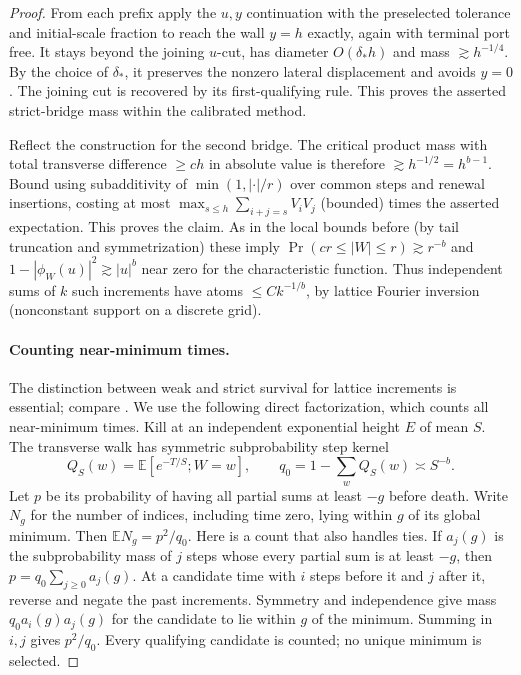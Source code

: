 \begin{proof}
From each prefix apply the $u,y$ continuation with the preselected
tolerance and initial-scale fraction to reach the wall $y=h$ exactly,
again with terminal port free. It stays beyond the joining $u$-cut,
has diameter $O(\delta_*h)$ and mass $\gtrsim h^{-1/4}$. By the choice
of $\delta_*$, it preserves the nonzero lateral displacement and avoids
$y=0$. The joining cut is recovered by its first-qualifying rule. This
proves the asserted strict-bridge mass within the calibrated method.

Reflect the construction for the second bridge. The critical product mass with total transverse difference $\ge ch$ in absolute value is therefore $\gtrsim h^{-1/2}=h^{b-1}$. Bound using subadditivity of \(\min(1,|\cdot|/r)\) over common steps and renewal insertions, costing at most \(\max_{s\le h}\sum_{i+j=s}V_i V_j\) (bounded) times the asserted expectation. This proves the claim. As in the local bounds before (by tail truncation and symmetrization) these imply \(\Pr(c r\le |W|\le r)\gtrsim r^{-b}\) and \(1-|\phi_W(u)|^2\gtrsim |u|^b\) near zero for the characteristic function. Thus independent sums of \(k\) such increments have atoms \(\le C k^{-1/b}\), by lattice Fourier inversion (nonconstant support on a discrete grid).

\paragraph{Counting near-minimum times.}
The distinction between weak and strict survival for lattice increments
is essential; compare \cite[Section 2.2]{Vysotsky2014}. We use the
following direct factorization, which counts all near-minimum times.
Kill at an independent exponential height $E$ of mean $S$. The transverse
walk has symmetric subprobability step kernel
\[
 Q_S(w)=\mathbb E[e^{-T/S};W=w],\qquad
 q_0=1-\sum_wQ_S(w)\asymp S^{-b}.
\]
Let $p$ be its probability of having all partial sums at least $-g$
before death. Write $N_g$ for the number of indices, including time zero,
lying within
$g$ of its global minimum. Then $\mathbb E N_g=p^2/q_0$. Here is a count that
also handles ties. If $a_j(g)$ is the subprobability mass of $j$ steps
whose every partial sum is at least $-g$, then
$p=q_0\sum_{j\ge0}a_j(g)$. At a candidate time with $i$ steps before
it and $j$ after it, reverse and negate the past increments. Symmetry
and independence give mass $q_0a_i(g)a_j(g)$ for the candidate to lie
within $g$ of the minimum. Summing in $i,j$ gives $p^2/q_0$.
Every qualifying candidate is counted; no unique minimum is selected.


\end{proof}
